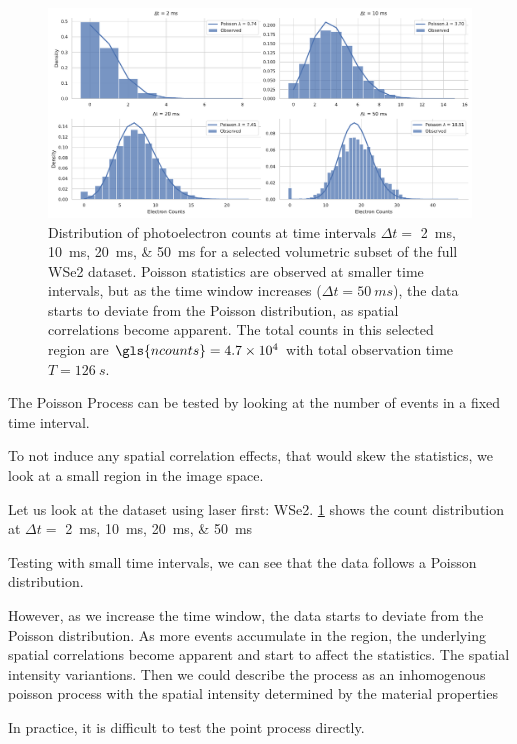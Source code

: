 \begin{figure}
    \centering
    \includegraphics[width=1\linewidth]{images/hist_counts_facetgrid_1_wse2.pdf}
    \caption{Distribution of photoelectron counts at time intervals $\Delta t =$ \qtylist{2;10;20;50}{ms} for a selected volumetric subset of the full \gls{WSe2} dataset. Poisson statistics are observed at smaller time intervals, but as the time window increases ($\Delta t = \qty{50}{ms}$), the data starts to deviate from the Poisson distribution, as spatial correlations become apparent. The total counts in this selected region are $\gls{ncounts}=\num{4.7e4}$ with total observation time $T=\qty{126}{s}$.}
    \label{fig:wse2-stats}
\end{figure}



The Poisson Process can be tested by looking at the number of events in a fixed time interval.

To not induce any spatial correlation effects, that would skew the statistics, we look at a small region in the image space.

Let us look at the dataset using laser first: \gls{WSe2}. \cref{fig:wse2-stats} shows the count distribution at $\Delta t =$ \qtylist{2;10;20;50}{ms}

Testing with small time intervals, we can see that the data follows a Poisson distribution.

However, as we increase the time window, the data starts to deviate from the Poisson distribution. As more events accumulate in the region, the underlying spatial correlations become apparent and start to affect the statistics. The spatial intensity variantions. Then we could describe the process as an inhomogenous poisson process with the spatial intensity determined by the material properties

In practice, it is difficult to test the point process directly. 

